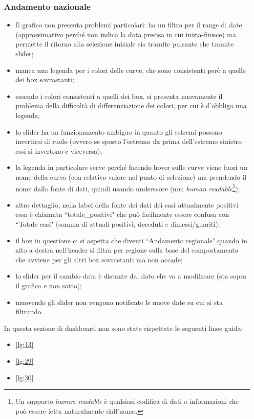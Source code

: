\subsubsection{Andamento nazionale}
\label{sss:andamento-nazionale}
\begin{itemize}
    \item Il grafico non presenta problemi particolari: ha un filtro per il range di date (approssimativo perché non indica la data precisa in cui inizia-finisce) ma permette il ritorno alla selezione iniziale sia tramite pulsante che tramite slider;
    \item manca una legenda per i colori delle curve, che sono consistenti però a quelle dei box sovrastanti;
    \item essendo i colori consistenti a quelli dei box, si presenta nuovamente il problema della difficoltà di differenziazione dei colori, per cui è d'obbligo una legenda;
    \item lo slider ha un funzionamento ambiguo in quanto gli estremi possono invertirsi di ruolo (ovvero se sposto l'estremo dx prima dell'estremo sinistro essi si invertono e viceversa);
    \item la legenda in particolare serve perché facendo hover sulle curve viene fuori un nome della curva (con relativo valore nel punto di selezione) ma prendendo il nome dalla fonte di dati, quindi usando underscore (non \textit{human readable}\footnote{Un supporto \textit{human readable} è qualsiasi codifica di dati o informazioni che può essere letta naturalmente dall'uomo.});
    \item altro dettaglio, nella label della fonte dei dati dei casi attualmente positivi essa è chiamata ``totale\_positivi" che può facilmente essere confusa con ``Totale casi" (somma di attuali positivi, deceduti e dimessi/guariti);
    \item il box in questione ci si aspetta che diventi ``Andamento regionale" quando in alto a destra nell'header si filtra per regione sulla base del comportamento che avviene per gli altri box sovrastanti ma non accade;
    \item lo slider per il cambio data è distante dal dato che va a modificare (sta sopra il grafico e non sotto);
    \item muovendo gli slider non vengono notificate le nuove date su cui si sta filtrando.
\end{itemize}
In questa sezione di dashboard non sono state rispettate le seguenti linee guida:
\begin{itemize}
    \item \ref{lg:13}
    \item \ref{lg:29}
    \item \ref{lg:30}
\end{itemize}

